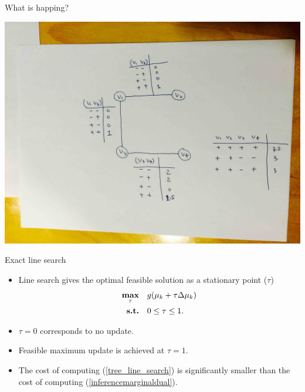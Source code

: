 \documentclass[first=dgreen,second=purple,logo=red]{aaltoslides}
\begin{document}
%
\begin{frame}{What is happing?}
	\begin{center}
		\includegraphics[scale=0.07]{./figures/dp.jpg}
	\end{center}
\end{frame}
%
\begin{frame}{Exact line search}
	\begin{itemize}
		\item Line search gives the optimal feasible solution as a stationary point ($\tau$)
		\begin{align}
			\underset{\tau}{\textbf{max}} &\quad g(\mathbf {\mu}_k + \tau\Delta\mathbf {\mu}_{k})\label{tree_line_search}\\
			\textbf{s.t.} &\quad 0\le\tau\le1.\nonumber
		\end{align}
		\item $\tau=0$ corresponds to no update.
		\item Feasible maximum update is achieved at $\tau=1$. 
		\item The cost of computing (\ref{tree_line_search}) is significantly smaller than the cost of computing (\ref{inferencemarginaldual}).
	\end{itemize}
\end{frame}
\end{document}
